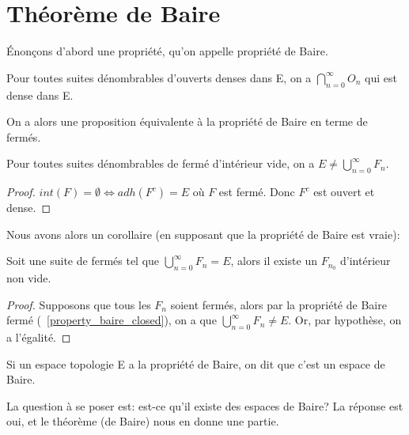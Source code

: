 \chapter{Théorème de Baire}

Énonçons d'abord une propriété, qu'on appelle propriété de Baire.

\begin{propriete} 
\label{property_baire_open}
	Pour toutes suites dénombrables d'ouverts denses dans E, on a $\displaystyle
	\bigcap_{n = 0}^{\infty} O_{n}$ qui est dense dans E.
\end{propriete}

On a alors une proposition équivalente à la propriété de Baire en terme de
fermés.

\begin{propriete} 
\label{property_baire_closed}
	Pour toutes suites dénombrables de fermé d'intérieur vide, on a $E \neq
	\displaystyle \bigcup_{n = 0}^{\infty} F_{n}$.
\end{propriete}

\begin{proof}
	$int(F) = \emptyset \Leftrightarrow adh(F^{c}) = E$ où $F$ est fermé. Donc
	$F^{c}$ est ouvert et dense.
\end{proof}

Nous avons alors un corollaire (en supposant que la propriété de Baire est
vraie):

\begin{corollary}
\label{corollary_baire_int_non_empty}
	Soit une suite  de fermés tel que $\displaystyle
	\bigcup_{n = 0}^{\infty}{F_{n}} = E$, alors il existe un $F_{n_{0}}$
	d'intérieur non vide.
\end{corollary}

\begin{proof}
	Supposons que tous les $F_{n}$ soient fermés, alors par la
	propriété de Baire fermé (~\ref{property_baire_closed}), on a que
	$\displaystyle \bigcup_{n = 0}^{\infty}{F_{n}} \neq E$. Or, par hypothèse,
	on a l'égalité.
\end{proof}

\begin{definition} 
\label{definition_baire_space}
	Si un espace topologie E a la propriété de Baire, on dit que c'est un espace
	de Baire.
\end{definition}

La question à se poser est: est-ce qu'il existe des espaces de Baire? La
réponse est oui, et le théorème (de Baire) nous en donne une partie.

